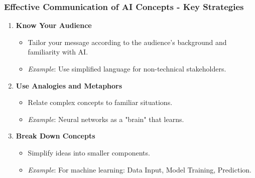 \documentclass{beamer}
\begin{document}
\begin{frame}[fragile]
    \frametitle{Effective Communication of AI Concepts - Key Strategies}
    \begin{enumerate}
        \item \textbf{Know Your Audience}
        \begin{itemize}
            \item Tailor your message according to the audience's background and familiarity with AI.
            \item \textit{Example}: Use simplified language for non-technical stakeholders.
        \end{itemize}

        \item \textbf{Use Analogies and Metaphors}
        \begin{itemize}
            \item Relate complex concepts to familiar situations.
            \item \textit{Example}: Neural networks as a "brain" that learns.
        \end{itemize}
        
        \item \textbf{Break Down Concepts}
        \begin{itemize}
            \item Simplify ideas into smaller components.
            \item \textit{Example}: For machine learning: Data Input, Model Training, Prediction.
        \end{itemize}
    \end{enumerate}
\end{frame}
\end{document}
